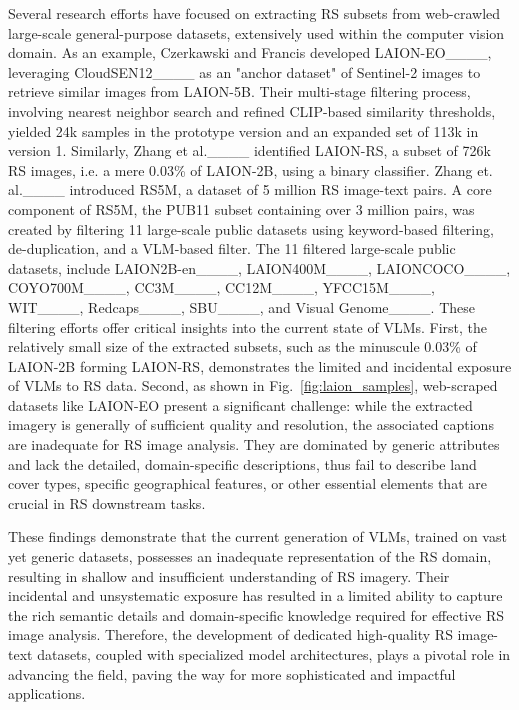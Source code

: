 Several research efforts have focused on extracting RS subsets from web-crawled large-scale general-purpose datasets, extensively used within the computer vision domain. As an example, Czerkawski and Francis developed LAION-EO____, leveraging CloudSEN12____ as an "anchor dataset" of Sentinel-2 images to retrieve similar images from LAION-5B. Their multi-stage filtering process, involving nearest neighbor search and refined CLIP-based similarity thresholds, yielded 24k samples in the prototype version and an expanded set of 113k in version 1. Similarly, Zhang et al.____ identified LAION-RS, a subset of 726k RS images, i.e. a mere 0.03\% of LAION-2B, using a binary classifier. Zhang et. al.____ introduced RS5M, a dataset of 5 million RS image-text pairs. A core component of RS5M, the PUB11 subset containing over 3 million pairs, was created by filtering 11 large-scale public datasets using keyword-based filtering, de-duplication, and a VLM-based filter. The 11 filtered large-scale public datasets, include LAION2B-en____, LAION400M____, LAIONCOCO____, COYO700M____, CC3M____, CC12M____, YFCC15M____, WIT____, Redcaps____, SBU____, and Visual Genome____. These filtering efforts offer critical insights into the current state of VLMs. First, the relatively small size of the extracted subsets, such as the minuscule 0.03\% of LAION-2B forming LAION-RS, demonstrates the limited and incidental exposure of VLMs to RS data. Second, as shown in Fig.~\ref{fig:laion_samples}, web-scraped datasets like LAION-EO present a significant challenge: while the extracted imagery is generally of sufficient quality and resolution, the associated captions are inadequate for RS image analysis. They are dominated by generic attributes and lack the detailed, domain-specific descriptions, thus fail to describe land cover types, specific geographical features, or other essential elements that are crucial in RS downstream tasks.

These findings demonstrate that the current generation of VLMs, trained on vast yet generic datasets, possesses an inadequate representation of the RS domain, resulting in shallow and insufficient understanding of RS imagery. Their incidental and unsystematic exposure has resulted in a limited ability to capture the rich semantic details and domain-specific knowledge required for effective RS image analysis. Therefore, the development of dedicated high-quality RS image-text datasets, coupled with specialized model architectures, plays a pivotal role in advancing the field, paving the way for more sophisticated and impactful applications.


